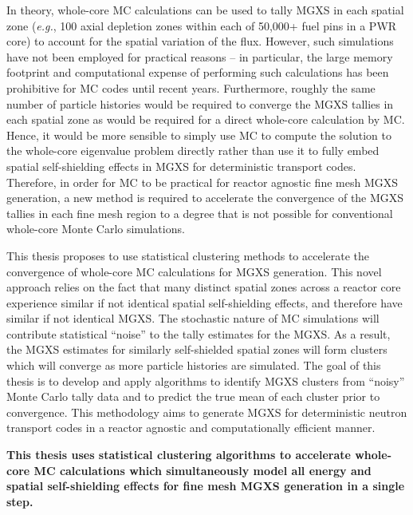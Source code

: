 In theory, whole-core \ac{MC} calculations can be used to tally \ac{MGXS} in each spatial zone (\textit{e.g.}, 100 axial depletion zones within each of 50,000+ fuel pins in a \ac{PWR} core) to account for the spatial variation of the flux. However, such simulations have not been employed for practical reasons -- in particular, the large memory footprint and computational expense of performing such calculations has been prohibitive for \ac{MC} codes until recent years. Furthermore, roughly the same number of particle histories would be required to converge the \ac{MGXS} tallies in each spatial zone as would be required for a direct whole-core calculation by \ac{MC}. Hence, it would be more sensible to simply use \ac{MC} to compute the solution to the whole-core eigenvalue problem directly rather than use it to fully embed spatial self-shielding effects in \ac{MGXS} for deterministic transport codes. Therefore, in order for \ac{MC} to be practical for reactor agnostic fine mesh \ac{MGXS} generation, a new method is required to accelerate the convergence of the \ac{MGXS} tallies in each fine mesh region to a degree that is not possible for conventional whole-core Monte Carlo simulations. 

This thesis proposes to use statistical clustering methods to accelerate the convergence of whole-core \ac{MC} calculations for \ac{MGXS} generation. This novel approach relies on the fact that many distinct spatial zones across a reactor core experience similar if not identical spatial self-shielding effects, and therefore have similar if not identical \ac{MGXS}. The stochastic nature of \ac{MC} simulations will contribute statistical ``noise'' to the tally estimates for the \ac{MGXS}. As a result, the \ac{MGXS} estimates for similarly self-shielded spatial zones will form clusters which will converge as more particle histories are simulated. The goal of this thesis is to develop and apply algorithms to identify \ac{MGXS} clusters from ``noisy'' Monte Carlo tally data and to predict the true mean of each cluster prior to convergence. This methodology aims to generate \ac{MGXS} for deterministic neutron transport codes in a reactor agnostic and computationally efficient manner.


\begin{emphbox}
\textbf{This thesis uses statistical clustering algorithms to accelerate whole-core \ac{MC} calculations
which simultaneously model all energy and spatial self-shielding effects for fine mesh \ac{MGXS} generation in a single step.}
\end{emphbox}


